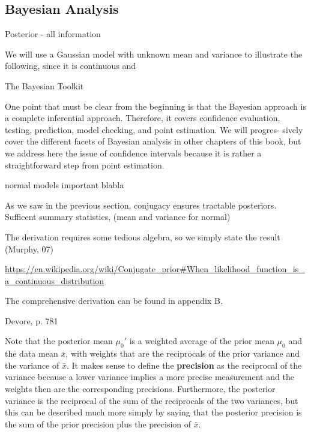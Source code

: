 \subsection{Bayesian Analysis}


Posterior - all information

We will use a Gaussian model with unknown mean and variance to illustrate the following, since it is continuous and

The Bayesian Toolkit

One point that must be clear from the beginning is that the Bayesian approach is a complete inferential approach. Therefore, it covers confidence evaluation, testing, prediction, model checking, and point estimation. We will progres- sively cover the different facets of Bayesian analysis in other chapters of this book, but we address here the issue of confidence intervals because it is rather a straightforward step from point estimation.

normal models important blabla

As we saw in the previous section, conjugacy ensures tractable posteriors. Sufficent summary statistics, (mean and variance for normal)

The derivation requires some tedious algebra, so we simply state the result (Murphy, 07)

\url{https://en.wikipedia.org/wiki/Conjugate_prior#When_likelihood_function_is_a_continuous_distribution}


The comprehensive derivation can be found in appendix B. 

Devore, p. 781 

Note that the posterior mean $\mu_0'$ is a weighted average of the prior mean $\mu_0$ and the data mean $\bar{x}$, with weights that are the reciprocals of the prior variance and the variance of $\bar{x}$. It makes sense to define the \textbf{precision} as the reciprocal of the variance because a lower variance implies a more precise measurement and the weights then are the corresponding precisions. Furthermore, the posterior variance is the reciprocal of the sum of the reciprocals of the two variances, but this can be described much more simply by saying that the posterior precision is the sum of the prior precision plus the precision of $\bar{x}$.  


